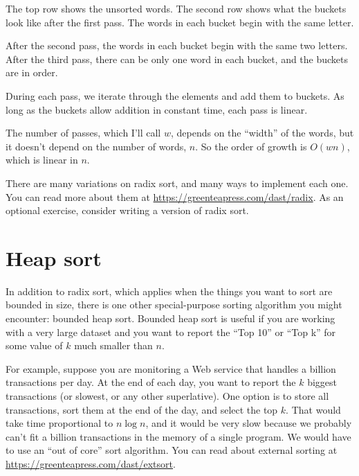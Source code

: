 \documentclass[12pt]{book}
\theoremstyle{exercise}
\begin{document}
The top row shows the unsorted words. The second row shows what the
buckets look like after the first pass. The words in each bucket begin
with the same letter.

After the second pass, the words in each bucket begin with the same two
letters. After the third pass, there can be only one word in each
bucket, and the buckets are in order.

During each pass, we iterate through the elements and add them to
buckets. As long as the buckets allow addition in constant time, each
pass is linear.


The number of passes, which I'll call $w$, depends on the ``width''
of the words, but it doesn't depend on the number of words, $n$.
So the order of growth is $O(wn)$, which is linear in $n$.

There are many variations on radix sort, and many ways to implement
each one. You can read more about them at
\url{https://greenteapress.com/dast/radix}. As an optional
exercise, consider writing a version of radix sort.


\section{Heap sort}
\label{heap-sort}


In addition to radix sort, which applies when the things you want to
sort are bounded in size, there is one other special-purpose sorting
algorithm you might encounter: bounded heap sort. Bounded heap sort is
useful if you are working with a very large dataset and you want to
report the ``Top 10'' or ``Top k'' for some value of $k$ much
smaller than $n$.

For example, suppose you are monitoring a Web service that handles a
billion transactions per day. At the end of each day, you want to
report the $k$ biggest transactions (or slowest, or any other
superlative). One option is to store all transactions, sort them at
the end of the day, and select the top $k$. That would take time
proportional to $n \log n$, and it would be very slow because we
probably can't fit a billion transactions in the memory of a single
program. We would have to use an ``out of core'' sort algorithm. You
can read about external sorting at \url{https://greenteapress.com/dast/extsort}.

\end{document}
